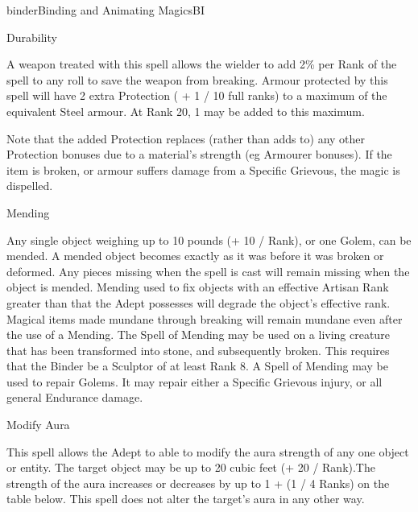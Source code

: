 \begin{college}[1.1]{binder}{Binding and Animating Magics}{BI}
\begin{spell}[G-4]{Durability}
\begin{effects}
A weapon treated with this spell allows the wielder to add 2\% per
Rank of the spell to any roll to save the weapon from breaking.
Armour protected by this spell will have 2 extra Protection ( + 1 / 10
full ranks) to a maximum of the equivalent Steel armour.  At Rank 20,
1 may be added to this maximum.

Note that the added Protection replaces (rather than adds to) any
other Protection bonuses due to a material's strength (eg Armourer
bonuses).  If the item is broken, or armour suffers damage from a
Specific Grievous, the magic is dispelled.
\end{effects}
\end{spell}

\begin{spell}[G-5]{Mending}

\begin{effects}
Any single object weighing up to 10 pounds (+ 10 / Rank), or one
Golem, can be mended. A mended object becomes exactly as it was before
it was broken or deformed. Any pieces missing when the spell is cast
will remain missing when the object is mended. Mending used to fix
objects with an effective Artisan Rank greater than that the Adept
possesses will degrade the object's effective rank. Magical items made
mundane through breaking will remain mundane even after the use of a
Mending. The Spell of Mending may be used on a living creature that
has been transformed into stone, and subsequently broken. This
requires that the Binder be a Sculptor of at least Rank 8. A Spell of
Mending may be used to repair Golems. It may repair either a Specific
Grievous injury, or all general Endurance damage.
\end{effects}
\end{spell}

\begin{spell}[G-6]{Modify Aura}

\begin{effects}
This spell allows the Adept to able to modify the aura strength of any
one object or entity. The target object may be up to 20 cubic feet (+
20 / Rank).The strength of the aura increases or decreases by up to 1
+ (1 / 4 Ranks) on the table below. This spell does not alter the
target's aura in any other way.


\end{effects}
\end{spell}
\end{college}
